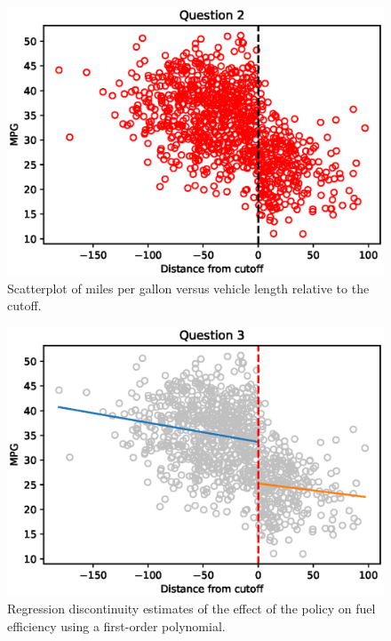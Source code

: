 \documentclass{article}
\begin{document}
\clearpage

\begin{figure}[ht]
\centering
\includegraphics{hw8q2.eps}
\caption{Scatterplot of miles per gallon versus vehicle length relative to the cutoff.}
\label{fig:hw8q2}
\end{figure}

\begin{figure}[ht]
\centering
\includegraphics{hw8q3.eps}
\caption{Regression discontinuity estimates of the effect of the policy on fuel efficiency using a first-order polynomial.}
\label{fig:hw8q3}
\end{figure}
\end{document}
